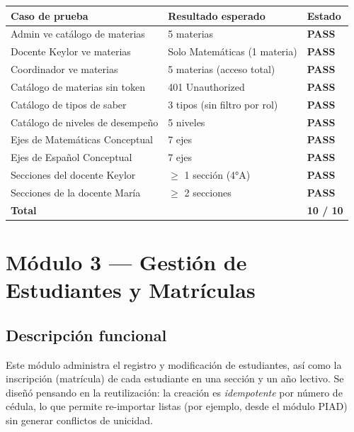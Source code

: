 \documentclass[11pt,a4paper,oneside]{article}
\newcommand{\pass}{\textbf{\color{ataraVerde}PASS}}
\begin{document}
\begin{table}[h]
\centering\renewcommand{\arraystretch}{1.15}\small
\begin{tabular}{@{}p{6.5cm} p{5.5cm} p{1.5cm}@{}}
\toprule
\textbf{Caso de prueba} & \textbf{Resultado esperado} & \textbf{Estado} \\
\midrule
Admin ve catálogo de materias               & 5 materias                       & \pass \\
Docente Keylor ve materias                  & Solo Matemáticas (1 materia)     & \pass \\
Coordinador ve materias                     & 5 materias (acceso total)        & \pass \\
Catálogo de materias sin token              & 401 Unauthorized                 & \pass \\
Catálogo de tipos de saber                  & 3 tipos (sin filtro por rol)     & \pass \\
Catálogo de niveles de desempeño            & 5 niveles                        & \pass \\
Ejes de Matemáticas Conceptual              & 7 ejes                           & \pass \\
Ejes de Español Conceptual                  & 7 ejes                           & \pass \\
Secciones del docente Keylor                & $\geq$ 1 sección (4°A)            & \pass \\
Secciones de la docente María               & $\geq$ 2 secciones                & \pass \\
\midrule
\textbf{Total}                              &                                  & \textbf{10 / 10} \\
\bottomrule
\end{tabular}
\end{table}

\section{Módulo 3 — Gestión de Estudiantes y Matrículas}

\subsection{Descripción funcional}

Este módulo administra el registro y modificación de estudiantes, así como la inscripción
(matrícula) de cada estudiante en una sección y un año lectivo. Se diseñó pensando en la
reutilización: la creación es \emph{idempotente} por número de cédula, lo que permite
re-importar listas (por ejemplo, desde el módulo PIAD) sin generar conflictos de unicidad.
\end{document}
